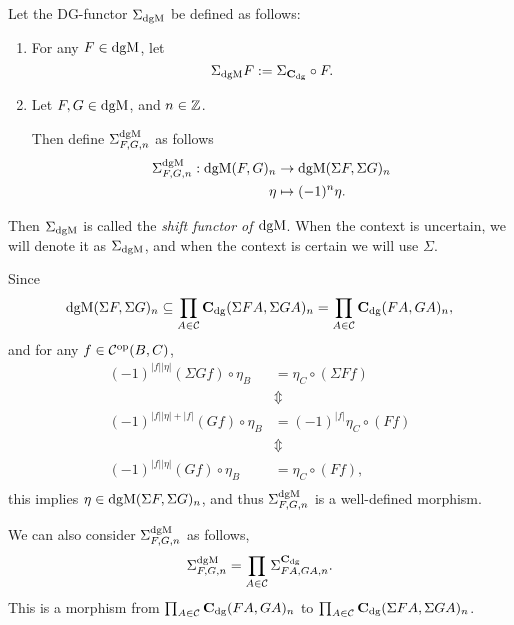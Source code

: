 \begin{definition}
    \label{def:sigma_dgmod}
    Let the DG-functor \( \Sigma_{\operatorname{dgM}} \) be defined as follows:
    \begin{enumerate}
        \item {
            For any \( F \in \operatorname{dgM} \), let
            \[
                \Sigma_{\operatorname{dgM}} F := \Sigma_{\operatorname{\mathbf{C}}_{\operatorname{dg}}} \circ F.
            \]
        }
        \item {
            Let \( F, G \in \operatorname{dgM} \), and \( n \in {\mathbb{Z}} \).
            
            Then define \( \Sigma_{F, G, n}^{\operatorname{dgM}} \) as follows
            \begin{align*}
                \Sigma_{F, G, n}^{\operatorname{dgM}}: \operatorname{dgM}(F, G)_n &\to \operatorname{dgM}(\Sigma F, \Sigma G)_n \\
                \eta &\mapsto (-1)^n \eta.
            \end{align*}
        }
    \end{enumerate}
    Then \( \Sigma_{\operatorname{dgM}} \) is called the \emph{shift functor of \( \operatorname{dgM} \)}. When the context is uncertain, we will denote it as \( \Sigma_{\operatorname{dgM}} \), and when the context is certain we will use \( \Sigma \).
\end{definition}

Since
\[
    \operatorname{dgM}(\Sigma F, \Sigma G)_n \subseteq \prod_{A \in {\mathcal{C}}} \operatorname{\mathbf{C}}_{\operatorname{dg}}(\Sigma F A, \Sigma G A)_n = \prod_{A \in {\mathcal{C}}} \operatorname{\mathbf{C}}_{\operatorname{dg}}(F A, G A)_n,
\]
and for any \( f \in {\mathcal{C}}^{\operatorname{op}}(B, C) \),
\begin{align*}
    (-1)^{|f||\eta|}(\Sigma G f) \circ \eta_{B} &= \eta_{C} \circ (\Sigma F f) \\
    &\Updownarrow \\
    (-1)^{|f||\eta| + |f|} (G f) \circ \eta_{B} &= (-1)^{|f|} \eta_{C} \circ (F f) \\
    &\Updownarrow \\
    (-1)^{|f||\eta|}(G f) \circ \eta_{B} &= \eta_{C} \circ (F f), \\
\end{align*}
this implies \( \eta \in \operatorname{dgM}(\Sigma F, \Sigma G)_n \), and thus \( \Sigma_{F, G, n}^{\operatorname{dgM}} \) is a well-defined morphism.

We can also consider \( \Sigma_{F, G, n}^{\operatorname{dgM}} \) as follows,
\[
    \Sigma_{F, G, n}^{\operatorname{dgM}} = \prod_{A \in {\mathcal{C}}} \Sigma_{F A, G A, n}^{\operatorname{\mathbf{C}}_{\operatorname{dg}}}.
\] 
This is a morphism from \( \prod_{A \in {\mathcal{C}}} \operatorname{\mathbf{C}}_{\operatorname{dg}}(F A, G A)_n \) to \( \prod_{A \in {\mathcal{C}}} \operatorname{\mathbf{C}}_{\operatorname{dg}}(\Sigma F A, \Sigma G A)_n \).

